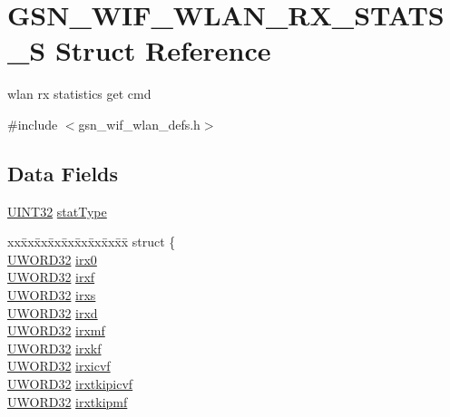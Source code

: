 \hypertarget{a00398}{
\section{GSN\_\-WIF\_\-WLAN\_\-RX\_\-STATS\_\-S Struct Reference}
\label{a00398}
}


wlan rx statistics get cmd  




{\ttfamily \#include $<$gsn\_\-wif\_\-wlan\_\-defs.h$>$}

\subsection*{Data Fields}
\begin{DoxyCompactItemize}
\item 
\hyperlink{a00660_gae1e6edbbc26d6fbc71a90190d0266018}{UINT32} \hyperlink{a00398_a1368e1d98f8be9ce5103d4d75a56588a}{statType}
\item 
\begin{tabbing}
xx\=xx\=xx\=xx\=xx\=xx\=xx\=xx\=xx\=\kill
struct \{\\
\>\hyperlink{a00677_gad0599cef3ddc489e9b2fe8afc3159f12}{UWORD32} \hyperlink{a00398_adc1f5ab02d021844e0e445e777944e1c}{irx0}\\
\>\hyperlink{a00677_gad0599cef3ddc489e9b2fe8afc3159f12}{UWORD32} \hyperlink{a00398_abfd937522ca873e832344f1c0dc8884f}{irxf}\\
\>\hyperlink{a00677_gad0599cef3ddc489e9b2fe8afc3159f12}{UWORD32} \hyperlink{a00398_a9d7a88c240dec187f668e734cdd72e74}{irxs}\\
\>\hyperlink{a00677_gad0599cef3ddc489e9b2fe8afc3159f12}{UWORD32} \hyperlink{a00398_a8916fd620005100e51c3c968296abe39}{irxd}\\
\>\hyperlink{a00677_gad0599cef3ddc489e9b2fe8afc3159f12}{UWORD32} \hyperlink{a00398_aa9d057005da78bcbddda3fabf920f0f6}{irxmf}\\
\>\hyperlink{a00677_gad0599cef3ddc489e9b2fe8afc3159f12}{UWORD32} \hyperlink{a00398_a09ba086e0dfd0edff67a57a282df1762}{irxkf}\\
\>\hyperlink{a00677_gad0599cef3ddc489e9b2fe8afc3159f12}{UWORD32} \hyperlink{a00398_adaa4438825b74d78811988fb064b3cd8}{irxicvf}\\
\>\hyperlink{a00677_gad0599cef3ddc489e9b2fe8afc3159f12}{UWORD32} \hyperlink{a00398_ab099589c8ae324e0f931459d5a979732}{irxtkipicvf}\\
\>\hyperlink{a00677_gad0599cef3ddc489e9b2fe8afc3159f12}{UWORD32} \hyperlink{a00398_a0bfc3871c452bfdda6a9b976bb03b641}{irxtkipmf}\\

\end{tabbing}
\end{DoxyCompactItemize}
